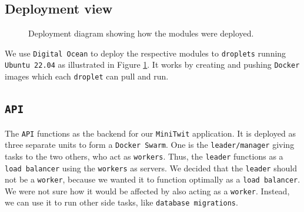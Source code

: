 \subsection{Deployment view}

\begin{figure}[H]
      \centering
      \caption{Deployment diagram showing how the modules were deployed.}
      \label{fig:deployment_diagram}
\end{figure}

We use \texttt{Digital Ocean} to deploy the respective modules to \texttt{droplets} running \texttt{Ubuntu 22.04} as illustrated in Figure \ref{fig:deployment_diagram}. 
It works by creating and pushing \texttt{Docker} images which each \texttt{droplet} can pull and run.

\subsection{\texttt{API}}

The \texttt{API} functions as the backend for our \texttt{MiniTwit} application.
It is deployed as three separate units to form a \texttt{Docker Swarm}. 
One is the \texttt{leader/manager} giving tasks to 
the two others, who act as \texttt{workers}. 
Thus, the \texttt{leader} functions as a \texttt{load balancer} using the \texttt{workers} as servers.
We decided that the \texttt{leader} should not be a \texttt{worker},
because we wanted it to function optimally as a \texttt{load balancer}.
We were not sure how it would be affected by also acting as a \texttt{worker}.
Instead, we can use it to run other side tasks, like \texttt{database migrations}.

